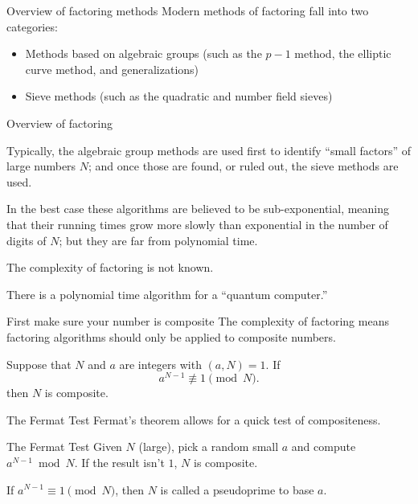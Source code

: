 \documentclass{beamer}
\begin{document}
\begin{frame}{Overview of factoring methods}
	Modern methods of factoring fall into two categories:
	\begin{itemize}
		\item Methods based on algebraic groups (such as the $p-1$ method, the elliptic curve method, and generalizations)
		\item Sieve methods (such as the quadratic and number field sieves)
	\end{itemize}
\end{frame}
\begin{frame}{Overview of factoring}

	Typically, the algebraic group methods are used first to identify ``small
	factors'' of large numbers $N$; and once those are found, or ruled out, the
	sieve methods are used.

\bigskip\noindent In the best case these algorithms are believed to be
	sub-exponential, meaning that their running times grow more slowly than
	exponential in the number of digits of $N$; but they are far from polynomial
	time.

\bigskip\noindent
	The complexity of factoring is not known.  
	
\bigskip\noindent 
	There is a polynomial time algorithm for a ``quantum computer.''
\end{frame}
\begin{frame}{First make sure your number is composite}
	The complexity of factoring means factoring algorithms should only be applied to composite numbers.

	\begin{theorem}[Fermat] Suppose that $N$ and $a$ are integers with $(a,N)=1$.  If 
		$$a^{N-1}\not\equiv 1\pmod{N}.$$
	then $N$ is composite.
	\end{theorem}
\end{frame}
\begin{frame}{The Fermat Test}
	Fermat's theorem allows for a quick test of compositeness.  
	
	\begin{block}{The Fermat Test}
	Given $N$ (large), pick a random small $a$ and compute $a^{N-1}\bmod{N}$.
	If the result isn't $1$, $N$ is composite. 
	\end{block}

	\begin{definition}
	If $a^{N-1}\equiv 1\pmod{N}$, then $N$ is called a pseudoprime to base $a$.
	\end{definition}
\end{frame}
\end{document}
